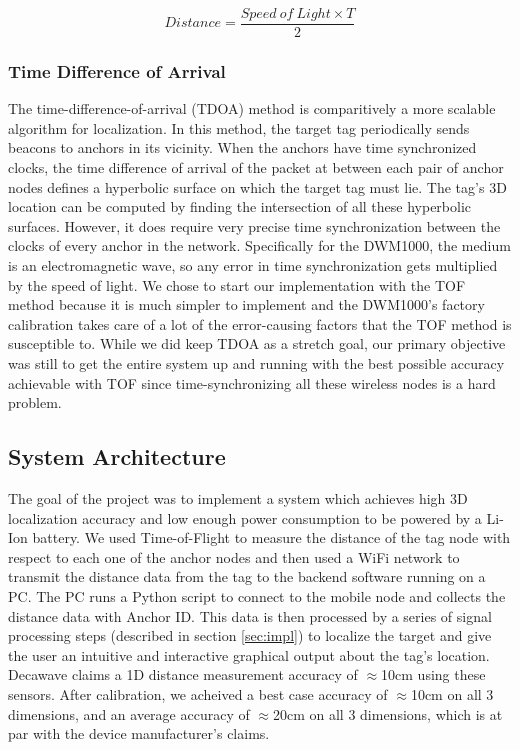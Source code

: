 \documentclass[journal,transmag]{IEEEtran}
\begin{document}
\begin{equation}
\label{eq:distcalc}
    Distance = \frac{Speed\ of\ Light \times T}{2}
\end{equation}

\subsubsection{Time Difference of Arrival}
The time-difference-of-arrival (TDOA) method is comparitively a more scalable algorithm for localization.  In this method, the target tag periodically sends beacons to anchors in its vicinity.  When the anchors have time synchronized clocks, the time difference of arrival of the packet at between each pair of anchor nodes defines a hyperbolic surface on which the target tag must lie.  The tag's 3D location can be computed by finding the intersection of all these hyperbolic surfaces. However, it does require very precise time synchronization between the clocks of every anchor in the network\cite{mcelroy2014comparison}.  Specifically for the DWM1000, the medium is an electromagnetic wave, so any error in time synchronization gets multiplied by the speed of light.  We chose to start our implementation with the TOF method because it is much simpler to implement and the DWM1000's factory calibration takes care of a lot of the error-causing factors that the TOF method is susceptible to.  While we did keep TDOA as a stretch goal, our primary objective was still to get the entire system up and running with the best possible accuracy achievable with TOF since time-synchronizing all these wireless nodes is a hard problem. 


\subsection{System Architecture}
The goal of the project was to implement a system which achieves high 3D localization accuracy and low enough power consumption to be powered by a Li-Ion battery.  We used Time-of-Flight to measure the distance of the tag node with respect to each one of the anchor nodes and then used a WiFi network to transmit the distance data from the tag to the backend software running on a PC.  The PC runs a Python script to connect to the mobile node and collects the distance data with Anchor ID.  This data is then processed by a series of signal processing steps (described in section \ref{sec:impl}) to localize the target and give the user an intuitive and interactive graphical output about the tag's location. Decawave claims a 1D distance measurement accuracy of $\approx$10cm using these sensors.  After calibration, we acheived a best case accuracy of $\approx$10cm on all 3 dimensions, and an average accuracy of $\approx$20cm on all 3 dimensions, which is at par with the device manufacturer's claims. \\
\end{document}
